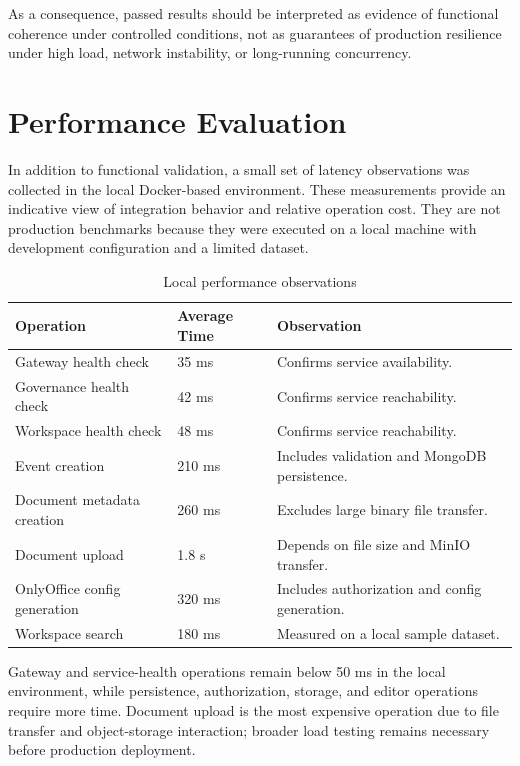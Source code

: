 As a consequence, passed results should be interpreted as evidence of functional
coherence under controlled conditions, not as guarantees of production
resilience under high load, network instability, or long-running concurrency.

\section{Performance Evaluation}

In addition to functional validation, a small set of latency observations was
collected in the local Docker-based environment. These measurements provide an
indicative view of integration behavior and relative operation cost. They are
not production benchmarks because they were executed on a local machine with
development configuration and a limited dataset.

\begin{table}[!htbp]
\centering
\caption{Local performance observations}
\label{tab:local-performance-observations}
{
\scriptsize
\renewcommand{\arraystretch}{1.05}
\setlength{\tabcolsep}{3.4pt}
\begin{tabularx}{\textwidth}{|Y|C{1.8cm}|Y|}
\hline
\textbf{Operation} & \textbf{Average Time} & \textbf{Observation} \\
\hline
Gateway health check & 35 ms & Confirms service availability. \\
\hline
Governance health check & 42 ms & Confirms service reachability. \\
\hline
Workspace health check & 48 ms & Confirms service reachability. \\
\hline
Event creation & 210 ms & Includes validation and MongoDB persistence. \\
\hline
Document metadata creation & 260 ms & Excludes large binary file transfer. \\
\hline
Document upload & 1.8 s & Depends on file size and MinIO transfer. \\
\hline
OnlyOffice config generation & 320 ms & Includes authorization and config generation. \\
\hline
Workspace search & 180 ms & Measured on a local sample dataset. \\
\hline
\end{tabularx}
}
\end{table}

Gateway and service-health operations remain below 50 ms in the local
environment, while persistence, authorization, storage, and editor operations
require more time. Document upload is the most expensive operation due to file
transfer and object-storage interaction; broader load testing remains necessary
before production deployment.

